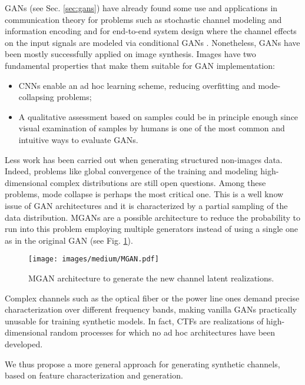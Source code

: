 GANs (see Sec. \ref{sec:gans}) have already found some use and applications in communication theory for problems such as stochastic channel modeling and information encoding \cite{OsheaGAN} and for end-to-end system design where the channel effects on the input signals are modeled via conditional GANs \cite{Ye2018}. Nonetheless,
GANs have been mostly successfully applied on image synthesis. Images have two fundamental properties that make them suitable for GAN implementation: 
\begin{itemize}
\item CNNs enable an ad hoc learning scheme, reducing overfitting and mode-collapsing problems;
\item A qualitative assessment based on samples could be in principle enough since visual examination of samples by humans is one of the most common and intuitive ways to evaluate GANs.
\end{itemize} 
Less work has been carried out when generating structured non-images data. Indeed, problems like global convergence of the training and modeling high-dimensional complex distributions are still open questions. 
Among these problems, mode collapse is perhaps the most critical one. This is a well know issue of GAN architectures and it is characterized by a partial sampling of the data distribution. MGANs \cite{MGAN} are
a possible architecture to reduce the probability to run into this problem employing multiple generators instead of using a single one as in the original GAN (see Fig. \ref{fig:medium_MGAN}).

\begin{figure}[t]
  \centering
	\texttt{[image: images/medium/MGAN.pdf]}
	\caption{MGAN architecture to generate the new channel latent realizations.}
	\label{fig:medium_MGAN}
\end{figure}%

Complex channels such as the optical fiber or the power line ones demand precise characterization over different frequency bands, making vanilla GANs practically unusable for training synthetic models. In fact, CTFs are realizations of high-dimensional random processes for which no ad hoc architectures have been developed.

We thus propose a more general approach for generating synthetic channels, based on feature characterization and generation.

